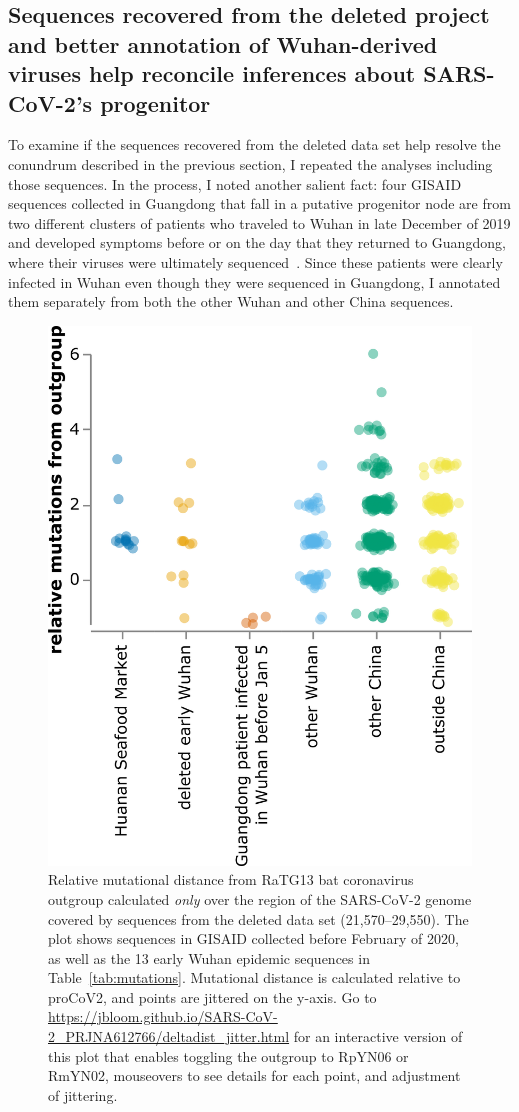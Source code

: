 \documentclass[9pt,twocolumn,twoside]{gsajnl_modified}
\begin{document}
\subsection{Sequences recovered from the deleted project and better annotation of Wuhan-derived viruses help reconcile inferences about SARS-CoV-2's progenitor}
To examine if the sequences recovered from the deleted data set help resolve the conundrum described in the previous section, I repeated the analyses including those sequences.
In the process, I noted another salient fact: four GISAID sequences collected in Guangdong that fall in a putative progenitor node are from two different clusters of patients who traveled to Wuhan in late December of 2019 and developed symptoms before or on the day that they returned to Guangdong, where their viruses were ultimately sequenced~\citep{chan2020familial, kang2020evidence}.
Since these patients were clearly infected in Wuhan even though they were sequenced in Guangdong, I annotated them separately from both the other Wuhan and other China sequences.

\begin{figure}
\centering
\includegraphics[width=0.75\linewidth]{figures/deltadist_jitter.png}
\caption{
Relative mutational distance from RaTG13 bat coronavirus outgroup calculated \emph{only} over the region of the SARS-CoV-2 genome covered by sequences from the deleted data set (21,570--29,550).
The plot shows sequences in GISAID collected before February of 2020, as well as the 13 early Wuhan epidemic sequences in Table~\ref{tab:mutations}.
Mutational distance is calculated relative to proCoV2, and points are jittered on the y-axis.
Go to \url{https://jbloom.github.io/SARS-CoV-2_PRJNA612766/deltadist_jitter.html} for an interactive version of this plot that enables toggling the outgroup to RpYN06 or RmYN02, mouseovers to see details for each point, and adjustment of jittering.
\label{fig:deltadist_jitter}
}
\end{figure}
\end{document}

